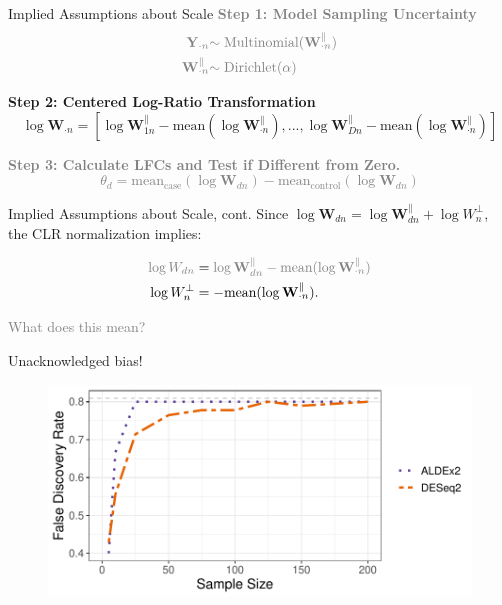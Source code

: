 \documentclass[
  ignorenonframetext,
]{beamer}
\begin{document}
\begin{frame}{Implied Assumptions about Scale}
\protect\hypertarget{implied-assumptions-about-scale}{}
\textcolor{gray}{\textbf{Step 1: Model Sampling Uncertainty}}
\begin{align*}
\textcolor{gray}{\mathbf{Y}_{\cdot n}} &\textcolor{gray}{\sim \text{Multinomial}(\mathbf{W}_{\cdot n}^\parallel)}\\
\textcolor{gray}{\mathbf{W}_{\cdot n}^\parallel} &\textcolor{gray}{\sim \text{Dirichlet}(\alpha)}
\end{align*}

\textbf{Step 2: Centered Log-Ratio Transformation} \begin{equation*}
\log \mathbf{W}_{\cdot n} = \left[\log \mathbf{W}_{1n}^\parallel - \text{mean}(\log \mathbf{W}_{\cdot n}^\parallel), ..., \log \mathbf{W}_{Dn}^\parallel - \text{mean}(\log \mathbf{W}_{\cdot n}^\parallel) \right]
\end{equation*}

\textcolor{gray}{\textbf{Step 3: Calculate LFCs and Test if Different from Zero.}
\begin{equation*}
\theta_d = \text{mean}_{\text{case}}(\log \mathbf{W}_{dn}) - \text{mean}_{\text{control}}(\log \mathbf{W}_{dn})
\end{equation*}}
\end{frame}

\begin{frame}{Implied Assumptions about Scale, cont.}
\protect\hypertarget{implied-assumptions-about-scale-cont.}{}
Since
\(\log \mathbf{W}_{dn} = \log \mathbf{W}_{dn}^\parallel + \log W_n^\perp\),
the CLR normalization implies:

\begin{align*}
\color{gray}{\log W_{dn}} &= \color{gray}{\log \mathbf{W}_{dn}^\parallel - \text{mean}(\log \mathbf{W}_{\cdot n}^\parallel)}\\
\log W_n^\perp &= -\text{mean}(\log \mathbf{W}_{\cdot n}^\parallel).
\end{align*}

\vspace{.25in}

\textcolor{gray}{What does this mean?}
\end{frame}

\begin{frame}{Unacknowledged bias!}
\protect\hypertarget{unacknowledged-bias}{}
\begin{figure}
  \centering
  \includegraphics[width=4.5in]{figures/unacknowledged_bias.pdf}
\end{figure}
\end{frame}
\end{document}
